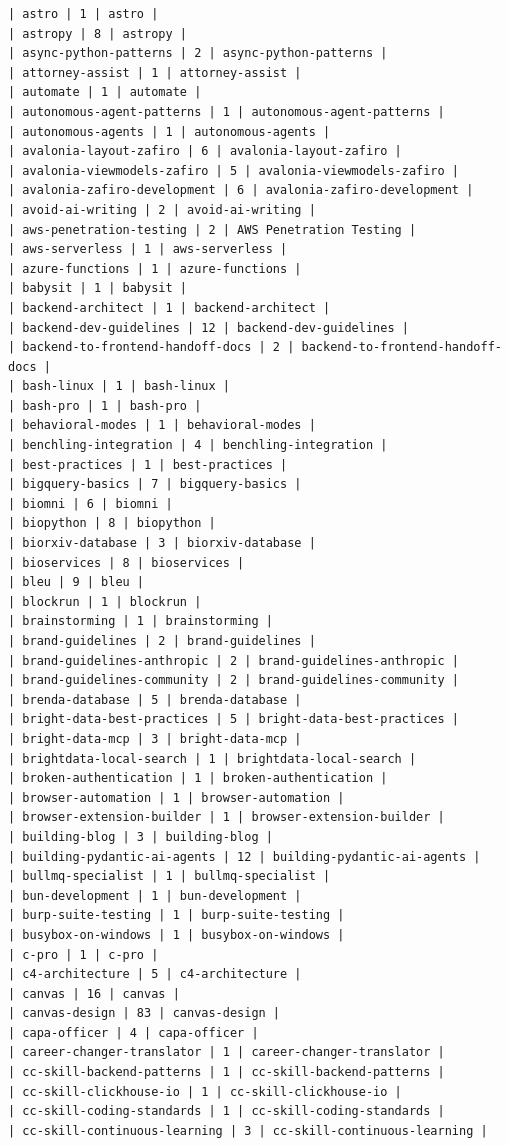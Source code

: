 \begin{Verbatim}[breaklines,breakanywhere,fontsize=\footnotesize]
| astro | 1 | astro |
| astropy | 8 | astropy |
| async-python-patterns | 2 | async-python-patterns |
| attorney-assist | 1 | attorney-assist |
| automate | 1 | automate |
| autonomous-agent-patterns | 1 | autonomous-agent-patterns |
| autonomous-agents | 1 | autonomous-agents |
| avalonia-layout-zafiro | 6 | avalonia-layout-zafiro |
| avalonia-viewmodels-zafiro | 5 | avalonia-viewmodels-zafiro |
| avalonia-zafiro-development | 6 | avalonia-zafiro-development |
| avoid-ai-writing | 2 | avoid-ai-writing |
| aws-penetration-testing | 2 | AWS Penetration Testing |
| aws-serverless | 1 | aws-serverless |
| azure-functions | 1 | azure-functions |
| babysit | 1 | babysit |
| backend-architect | 1 | backend-architect |
| backend-dev-guidelines | 12 | backend-dev-guidelines |
| backend-to-frontend-handoff-docs | 2 | backend-to-frontend-handoff-docs |
| bash-linux | 1 | bash-linux |
| bash-pro | 1 | bash-pro |
| behavioral-modes | 1 | behavioral-modes |
| benchling-integration | 4 | benchling-integration |
| best-practices | 1 | best-practices |
| bigquery-basics | 7 | bigquery-basics |
| biomni | 6 | biomni |
| biopython | 8 | biopython |
| biorxiv-database | 3 | biorxiv-database |
| bioservices | 8 | bioservices |
| bleu | 9 | bleu |
| blockrun | 1 | blockrun |
| brainstorming | 1 | brainstorming |
| brand-guidelines | 2 | brand-guidelines |
| brand-guidelines-anthropic | 2 | brand-guidelines-anthropic |
| brand-guidelines-community | 2 | brand-guidelines-community |
| brenda-database | 5 | brenda-database |
| bright-data-best-practices | 5 | bright-data-best-practices |
| bright-data-mcp | 3 | bright-data-mcp |
| brightdata-local-search | 1 | brightdata-local-search |
| broken-authentication | 1 | broken-authentication |
| browser-automation | 1 | browser-automation |
| browser-extension-builder | 1 | browser-extension-builder |
| building-blog | 3 | building-blog |
| building-pydantic-ai-agents | 12 | building-pydantic-ai-agents |
| bullmq-specialist | 1 | bullmq-specialist |
| bun-development | 1 | bun-development |
| burp-suite-testing | 1 | burp-suite-testing |
| busybox-on-windows | 1 | busybox-on-windows |
| c-pro | 1 | c-pro |
| c4-architecture | 5 | c4-architecture |
| canvas | 16 | canvas |
| canvas-design | 83 | canvas-design |
| capa-officer | 4 | capa-officer |
| career-changer-translator | 1 | career-changer-translator |
| cc-skill-backend-patterns | 1 | cc-skill-backend-patterns |
| cc-skill-clickhouse-io | 1 | cc-skill-clickhouse-io |
| cc-skill-coding-standards | 1 | cc-skill-coding-standards |
| cc-skill-continuous-learning | 3 | cc-skill-continuous-learning |

\end{Verbatim}
